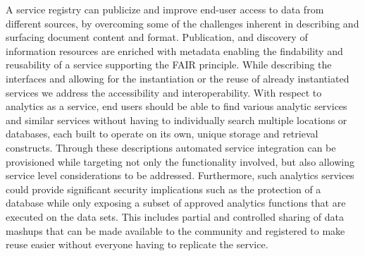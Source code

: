 A service registry can publicize and improve end-user access to data
from different sources, by overcoming some of the challenges inherent
in describing and surfacing document content and format. Publication,
and discovery of information resources are enriched with metadata
enabling the findability and reusability of a service supporting the
FAIR principle. While describing the interfaces and allowing for the
instantiation or the reuse of already instantiated services we address
the accessibility and interoperability. With respect to analytics as a
service, end users should be able to find various analytic services
and similar services without having to individually search multiple
locations or databases, each built to operate on its own, unique
storage and retrieval constructs. Through these descriptions automated
service integration can be provisioned while targeting not only the
functionality involved, but also allowing service level considerations
to be addressed. Furthermore, such analytics services could provide
significant security implications such as the protection of a database
while only exposing a subset of approved analytics functions that are
executed on the data sets. This includes partial and controlled
sharing of data mashups that can be made available to the community and
registered to make reuse easier without everyone having to replicate
the service.

